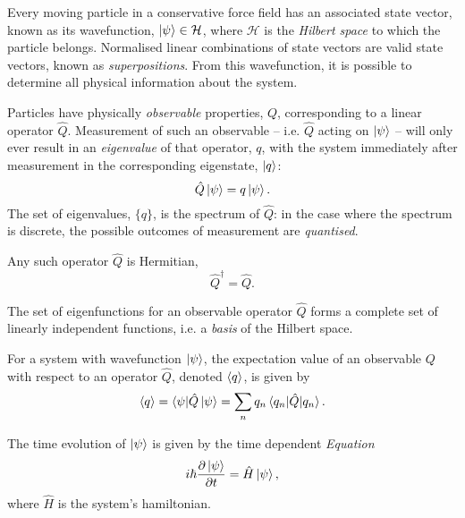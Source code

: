 \begin{postulate}
\item \label{postulate:conservative_force_field} 
    Every moving particle in a conservative force field has an associated state vector, 
        known as its wavefunction, $\ket{\psi} \in \mathcal{H}$, 
        where $\mathcal{H}$ is the \emph{Hilbert space} to which the particle belongs. 
    Normalised linear combinations of state vectors are valid state vectors, 
        known as \emph{superpositions}.
    From this wavefunction, it is possible to determine all physical information about the system. 
\item \label{postulate:eigenvalues} 
    Particles have physically \emph{observable} properties, $Q$, corresponding to a linear operator $\hat{Q}$.
    Measurement of such an observable -- i.e. $\hat{Q}$ acting on $\ket{\psi}$ -- 
        will only ever result in an \emph{eigenvalue} of that operator, $q$, 
        with the system immediately after measurement in the corresponding eigenstate, $\ket{q}$:
    \begin{equation}
    \hat{Q} \ket{\psi} = q \ket{\psi}.
    \end{equation}
    The set of eigenvalues, $\{q\}$, is the spectrum of $\hat{Q}$: 
        in the case where the spectrum is discrete, 
        the possible outcomes of measurement are \emph{quantised}.
\item \label{postulate:hermiticity}
    Any such operator  $\hat{Q}$ is Hermitian,
    \begin{equation}
        \hat{Q}^\dag = \hat{Q}.
    \end{equation}
\item \label{postulate:eigenfunction}
    The set of eigenfunctions for an observable operator $\hat{Q}$ forms a complete set of linearly independent functions, 
    i.e. a \emph{basis} of the Hilbert space.
\item \label{postulate:expectation_values}
    For a system with wavefunction $ \ket{\psi}$, the expectation value of an observable $Q$
        with respect to an operator $\hat{Q}$, denoted $\braket{q}$, is given by 
    \begin{equation}
    \braket{q} = \langle \psi | \hat{Q} \ket{\psi} = \sum_{n} q_n \braket{q_n | \hat{Q} | q_n}.
    \end{equation}
\item \label{postulate:schrodinger_eqn}
    The time evolution of $ \ket{\psi}$ is given by the time dependent \emph{\schrodinger Equation}
    \begin{equation}
    i \hbar \frac{\partial \ket{\psi}}{\partial t} = \hat{H} \ket{\psi},
    \end{equation}
    where $\hat{H}$ is the system's \gls{hamiltonian}.
\end{postulate}
 
